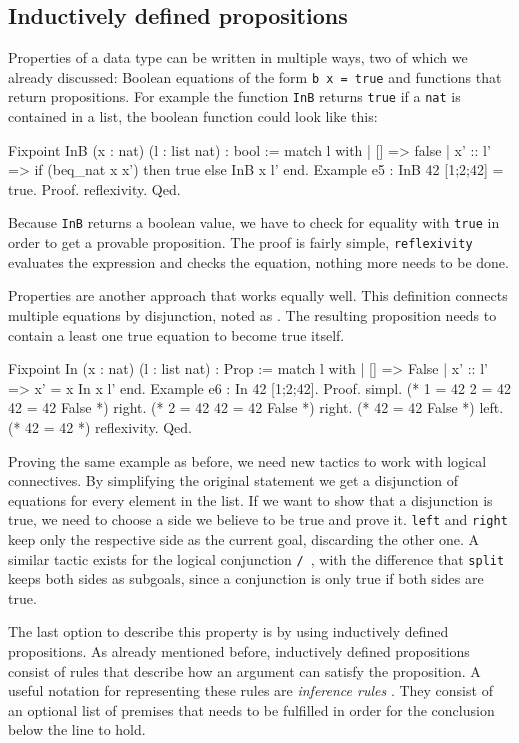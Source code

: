 \documentclass[fleqn]{scrreprt}
\newcommand{\coqinline}[1]{\texttt{#1}}
\begin{document}
\subsection{Inductively defined propositions}
Properties of a data type can be written in multiple ways, two of which we already discussed: Boolean equations of the form \coqinline{b x = true} and functions that return propositions. For example the function \coqinline{InB} returns \coqinline{true} if a \coqinline{nat} is contained in a list, the boolean function could look like this:
\begin{coqcode}
Fixpoint InB (x : nat) (l : list nat) : bool :=
match l with
| [] => false
| x' :: l' => if (beq_nat x x') then true else InB x l'
end.
Example e5 : InB 42 [1;2;42] = true.
Proof. reflexivity. Qed.
\end{coqcode}
Because \coqinline{InB} returns a boolean value, we have to check for equality with \coqinline{true} in order to get a provable proposition. The proof is fairly simple, \coqinline{reflexivity} evaluates the expression and checks the equation, nothing more needs to be done.
\par 
Properties are another approach that works equally well. This definition connects multiple equations by disjunction, noted as \coqinline{\/}. The resulting proposition needs to contain a least one true equation to become true itself.
\begin{coqcode}
Fixpoint In (x : nat) (l : list nat) : Prop :=
match l with
| [] => False
| x' :: l' => x' = x \/ In x l'
end.
Example e6 : In 42 [1;2;42].
Proof. 
  simpl. (* 1 = 42 \/ 2 = 42 \/ 42 = 42 \/ False *)
  right.           (* 2 = 42 \/ 42 = 42 \/ False *)
  right.                     (* 42 = 42 \/ False *)
  left.                      (* 42 = 42 *)
  reflexivity.
Qed.
\end{coqcode}
Proving the same example as before, we need new tactics to work with logical connectives. By simplifying the original statement we get a disjunction of equations for every element in the list. If we want to show that a disjunction is true, we need to choose a side we believe to be true and prove it. \coqinline{left} and \coqinline{right} keep only the respective side as the current goal, discarding the other one. A similar tactic exists for the logical conjunction \coqinline{/\ }, with the difference that \coqinline{split} keeps both sides as subgoals, since a conjunction is only true if both sides are true.
\par
The last option to describe this property is by using inductively defined propositions. As already mentioned before, inductively defined propositions consist of rules that describe how an argument can satisfy the proposition. A useful notation for representing these rules are \textit{inference rules} \label{infrules}. They consist of an optional list of premises that needs to be fulfilled in order for the conclusion below the line to hold.
\end{document}
